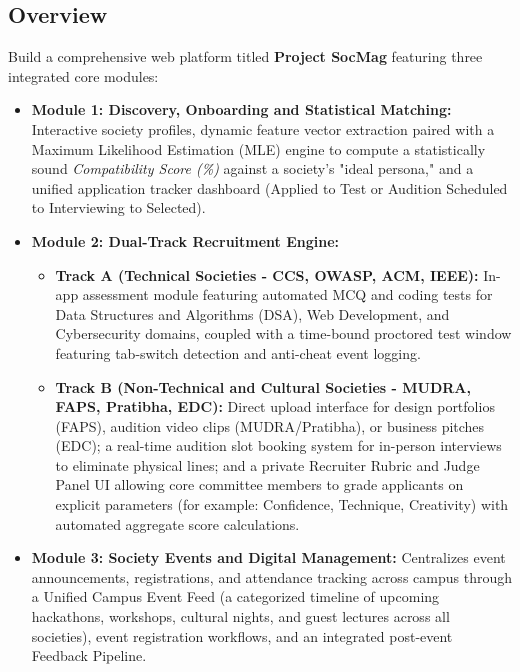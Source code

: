 \documentclass[11pt,a4paper]{article}
\begin{document}
\subsection{Overview}
Build a comprehensive web platform titled \textbf{Project SocMag} featuring three integrated core modules:
\begin{itemize}[leftmargin=0.7cm]
    \item \textbf{Module 1: Discovery, Onboarding and Statistical Matching:} Interactive society profiles, dynamic feature vector extraction paired with a Maximum Likelihood Estimation (MLE) engine to compute a statistically sound \emph{Compatibility Score (\%)} against a society's "ideal persona," and a unified application tracker dashboard (Applied to Test or Audition Scheduled to Interviewing to Selected).
    \item \textbf{Module 2: Dual-Track Recruitment Engine:}
    \begin{itemize}
        \item \textbf{Track A (Technical Societies - CCS, OWASP, ACM, IEEE):} In-app assessment module featuring automated MCQ and coding tests for Data Structures and Algorithms (DSA), Web Development, and Cybersecurity domains, coupled with a time-bound proctored test window featuring tab-switch detection and anti-cheat event logging.
        \item \textbf{Track B (Non-Technical and Cultural Societies - MUDRA, FAPS, Pratibha, EDC):} Direct upload interface for design portfolios (FAPS), audition video clips (MUDRA/Pratibha), or business pitches (EDC); a real-time audition slot booking system for in-person interviews to eliminate physical lines; and a private Recruiter Rubric and Judge Panel UI allowing core committee members to grade applicants on explicit parameters (for example: Confidence, Technique, Creativity) with automated aggregate score calculations.
    \end{itemize}
    \item \textbf{Module 3: Society Events and Digital Management:} Centralizes event announcements, registrations, and attendance tracking across campus through a Unified Campus Event Feed (a categorized timeline of upcoming hackathons, workshops, cultural nights, and guest lectures across all societies), event registration workflows, and an integrated post-event Feedback Pipeline.
\end{itemize}
\end{document}
